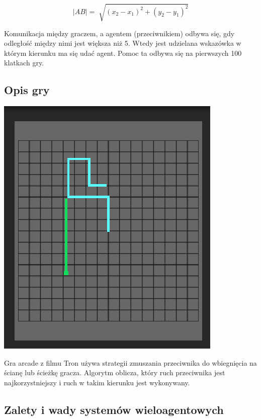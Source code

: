 \documentclass[12pt,a4paper]{article}
\begin{document}
	$$\left | AB \right |=\sqrt[]{(x_2-x_1)^2+(y_2-y_1)^2}$$
	
	Komunikacja między graczem, a agentem (przeciwnikiem) odbywa się, gdy odległość między nimi jest większa niż 5. Wtedy jest udzielana wskazówka w którym kierunku ma się udać agent. Pomoc ta odbywa się na pierwszych 100 klatkach gry.
    
    \subsection*{Opis gry}
    
    \includegraphics[scale=0.85,keepaspectratio]{gra.png}
    
    Gra arcade z filmu Tron używa strategii zmuszania przeciwnika do wbiegnięcia na ścianę lub ścieżkę gracza. Algorytm oblicza, który ruch przeciwnika jest najkorzystniejszy i ruch w takim kierunku jest wykonywany.


	\subsection*{Zalety i wady systemów wieloagentowych}
\end{document}
